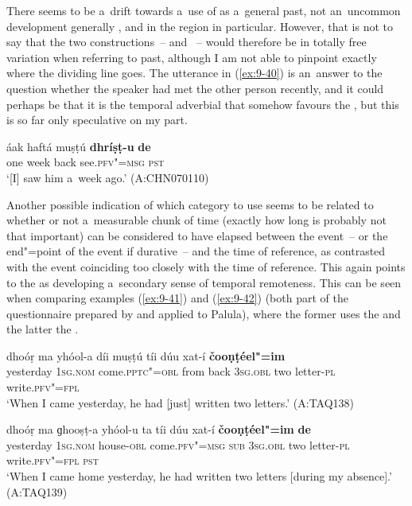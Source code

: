 There seems to be a~drift towards a~use of  as a~general  past, not an~uncommon development generally \citep[147]{dahl1985}, and in the region in particular. However, that is not to say that the two constructions~--  and ~-- would therefore be in totally free variation when referring to  past, although I am not able to pinpoint exactly where the dividing line goes. The utterance in (\ref{ex:9-40}) is an~answer to the question whether the speaker had met the other person recently, and it could perhaps be that it is the temporal adverbial  that somehow favours the , but this is so far only speculative on my part.

\begin{exe}
\ex
\label{ex:9-40}
\gll áak haftá muṣṭú \textbf{dhríṣṭ-u} \textbf{de}  \\
one week back see.\textsc{pfv"=msg} \textsc{pst} \\
\glt `[I] saw him a~week ago.' (A:CHN070110)
\end{exe}

Another possible indication of which category to use seems to be related to whether or not a~measurable chunk of time (exactly how long is probably not that important) can be considered to have elapsed between the event~-- or the end"=point of the event if durative~-- and the time of reference, as contrasted with the event coinciding too closely with the time of reference. This again points to the  as developing a~secondary sense of temporal remoteness. This can be seen when comparing examples (\ref{ex:9-41}) and (\ref{ex:9-42}) (both part of the questionnaire prepared by \citet{dahl1985} and applied to Palula), where the former uses the  and the latter the .

\ea
\label{ex:9-41}
\gll dhoóṛ ma yhóol-a díi muṣṭú tíi dúu xat-í \textbf{čooṇṭéel"=im}\\
yesterday 1\textsc{sg.nom} come.\textsc{pptc"=obl} from back \textsc{3sg.obl} two letter-\textsc{pl} write.\textsc{pfv"=fpl}\\
\glt `When I came yesterday, he had [just] written two letters.' (A:TAQ138)

\ex
\label{ex:9-42}
\gll dhoóṛ ma ɡhooṣṭ-a yhóol-u ta tíi dúu xat-í \textbf{čooṇṭéel"=im} \textbf{de} \\
yesterday 1\textsc{sg.nom} house-\textsc{obl} come.\textsc{pfv"=msg}  \textsc{sub} \textsc{3sg.obl} two letter-\textsc{pl} write.\textsc{pfv"=fpl} \textsc{pst} \\
\glt `When I came home yesterday, he had written two letters [during my absence].' (A:TAQ139)
\z

